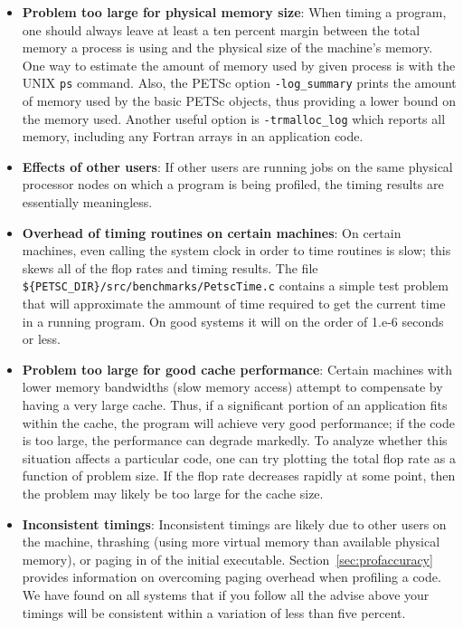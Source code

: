{\begin{itemize}
\item {\bf Problem too large for physical memory size}: When timing a program, one
      should always leave at least a ten percent margin between the total
      memory a process is using and the physical size of 
      the machine's memory. One way to estimate the amount of 
      memory used by given process is with the UNIX {\tt ps} command.
      Also, the PETSc option {\tt -log\_summary} prints the amount of 
      memory used by the basic PETSc objects, thus providing a lower
      bound on the memory used.  Another useful option is {\tt -trmalloc\_log}
      which reports all memory, including any Fortran arrays in an
      application code.
\item {\bf Effects of other users}:  If other users are running
      jobs on the same physical processor nodes on which a program is being profiled,
      the timing results are essentially meaningless. 
\item {\bf Overhead of timing routines on certain machines}: On certain machines,
      even calling the system clock in order to time routines is 
      slow; this skews all of the flop rates and timing results. The file
      {\tt \$\{PETSC\_DIR\}/src/benchmarks/PetscTime.c} contains a
      simple test problem that will approximate the ammount of time
      required to get the current time in a running program. On good
      systems it will on the order of 1.e-6 seconds or less.
\item {\bf Problem too large for good cache performance}: Certain machines
      with lower memory bandwidths (slow memory access) attempt to 
      compensate by having a very large cache.  Thus, if a significant
      portion of an application fits within the cache, the program will achieve very 
      good performance; if the code is too large, the performance can degrade markedly.
      To analyze whether this situation affects a particular code, one can
      try plotting the total flop rate as a function of problem
      size.  If the flop rate decreases rapidly at some point, then the
      problem may likely be too large for the cache size. 
\item {\bf Inconsistent timings}:  Inconsistent timings are likely due to other
      users on the machine, thrashing (using more virtual memory than available
      physical memory), or paging in of the initial executable.  
      Section~\ref{sec:profaccuracy} provides information on overcoming paging
      overhead when profiling a code. We have found on all systems that if you 
      follow all the advise above your timings will be consistent within a variation
      of less than five percent.
\end{itemize}

}
